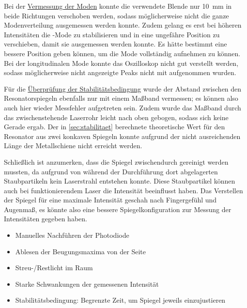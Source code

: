     Bei der \hyperref[sec:auswertung:tem_moden]{Vermessung der Moden} konnte die verwendete Blende nur \SI{10}{\milli\meter} in beide Richtungen verschoben werden,
    sodass möglicherweise nicht die ganze Modenverteilung ausgemessen werden konnte.
    Zudem gelang es erst bei höheren Intensitäten
    die -Mode zu stabilisieren und in eine ungefähre Position zu verschieben,
    damit sie ausgemessen werden konnte.
    Es hätte bestimmt eine bessere Position geben können,
    um die Mode vollständig aufnehmen zu können.\\
    Bei der longitudinalen Mode konnte das Oszilloskop nicht gut verstellt werden,
    sodass möglicherweise nicht angezeigte Peaks nicht mit aufgenommen wurden.


    Für die \hyperref[sec:auswertung:stabilitaetsbedingung]{Überprüfung der Stabilitätsbedingung}
    wurde der Abstand zwischen den Resonatorspiegeln ebenfalls nur mit einem Maßband vermessen;
    es können also auch hier wieder Messfehler aufgetreten sein.
    Zudem wurde das Maßband durch das zwischenstehende Laserrohr leicht nach oben gebogen,
    sodass sich keine Gerade ergab.
    Der in \autoref{sec:stabilitaet} berechnete theoretische Wert für den Resonator aus zwei konkaven Spiegeln
    konnte aufgrund der nicht ausreichenden Länge der Metallschiene nicht erreicht werden.


    Schließlich ist anzumerken,
    dass die Spiegel zwischendurch gereinigt werden mussten,
    da aufgrund von während der Durchführung dort abgelagerten Staubpartikeln kein Laserstrahl entstehen konnte.
    Diese Staubpartikel können auch bei funktionierendem Laser die Intensität beeinflusst haben.
    Das Verstellen der Spiegel für eine maximale Intensität geschah nach Fingergefühl und Augenmaß,
    es könnte also eine bessere Spiegelkonfiguration zur Messung der Intensitäten gegeben haben.

\begin{itemize}
    \item Manuelles Nachführen der Photodiode
    \item Ablesen der Beugungsmaxima von der Seite
    \item Streu-/Restlicht im Raum
    \item Starke Schwankungen der gemessenen Intensität
    \item Stabilitätsbedingung: Begrenzte Zeit, um Spiegel jeweils einzujustieren
\end{itemize}
